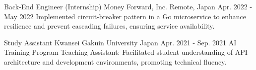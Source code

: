 \begin{cventries}
  \cventry
    {Back-End Engineer (Internship)} %
    {Money Forward, Inc.} %
    {Remote, Japan} %
    {Apr. 2022 - May 2022} %
    {
        Implemented circuit-breaker pattern in a Go microservice to enhance resilience and prevent cascading failures, ensuring service availability.
    }


\cventry
  {Study Assistant} %
  {Kwansei Gakuin University} %
  {Japan} %
  {Apr. 2021 - Sep. 2021} %
  {
      AI Training Program Teaching Assistant: Facilitated student understanding of API architecture and development environments, promoting technical fluency.
  }

\end{cventries}
